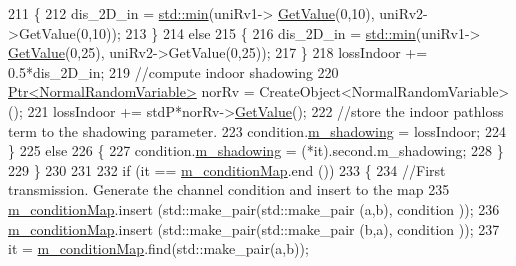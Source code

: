 \begin{DoxyCode}
211                                 \{
212                                         dis\_2D\_in = \hyperlink{80211b_8c_ac6afabdc09a49a433ee19d8a9486056d}{std::min}(uniRv1->
      \hyperlink{classns3_1_1UniformRandomVariable_a03822d8c86ac51e9aa83bbc73041386b}{GetValue}(0,10), uniRv2->GetValue(0,10));
213                                 \}
214                                 \textcolor{keywordflow}{else}
215                                 \{
216                                         dis\_2D\_in = \hyperlink{80211b_8c_ac6afabdc09a49a433ee19d8a9486056d}{std::min}(uniRv1->
      \hyperlink{classns3_1_1UniformRandomVariable_a03822d8c86ac51e9aa83bbc73041386b}{GetValue}(0,25), uniRv2->GetValue(0,25));
217                                 \}
218                                 lossIndoor += 0.5*dis\_2D\_in;
219                                 \textcolor{comment}{//compute indoor shadowing}
220                                 \hyperlink{classns3_1_1Ptr}{Ptr<NormalRandomVariable>} norRv = 
      CreateObject<NormalRandomVariable> ();
221                                 lossIndoor += stdP*norRv->\hyperlink{classns3_1_1NormalRandomVariable_a0134d131477bc439cc6ff7cbe84b03a9}{GetValue}();
222                                 \textcolor{comment}{//store the indoor pathloss term to the shadowing parameter.}
223                                 condition.\hyperlink{structchannelCondition_abf42a510bc41e8eb84c96f9b47cc8f47}{m\_shadowing} = lossIndoor;
224                         \}
225                         \textcolor{keywordflow}{else}
226                         \{
227                                 condition.\hyperlink{structchannelCondition_abf42a510bc41e8eb84c96f9b47cc8f47}{m\_shadowing} = (*it).second.m\_shadowing;
228                         \}
229                 \}
230 
231 
232                 \textcolor{keywordflow}{if} (it == \hyperlink{classns3_1_1MmWave3gppBuildingsPropagationLossModel_a18b00c0130a2924ec13a7885543fc569}{m\_conditionMap}.end ())
233                 \{
234                         \textcolor{comment}{//First transmission. Generate the channel condition and insert to the map}
235                         \hyperlink{classns3_1_1MmWave3gppBuildingsPropagationLossModel_a18b00c0130a2924ec13a7885543fc569}{m\_conditionMap}.insert (std::make\_pair(std::make\_pair (a,b), condition
      ));
236                         \hyperlink{classns3_1_1MmWave3gppBuildingsPropagationLossModel_a18b00c0130a2924ec13a7885543fc569}{m\_conditionMap}.insert (std::make\_pair(std::make\_pair (b,a), condition
      ));
237                         it = \hyperlink{classns3_1_1MmWave3gppBuildingsPropagationLossModel_a18b00c0130a2924ec13a7885543fc569}{m\_conditionMap}.find(std::make\_pair(a,b));

\end{DoxyCode}
